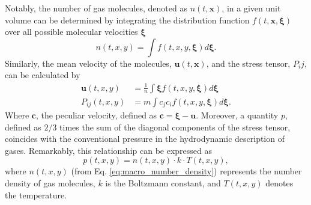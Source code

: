 Notably, the number of gas molecules, denoted as $n(t,\mathbf{x})$, in a given unit volume can be determined by integrating the distribution function $f(t,\mathbf{x},\boldsymbol{\xi})$ over all possible molecular velocities $\boldsymbol{\xi}$\cite{kogan1969rarefied}
\begin{equation} \label{eq:macro_number_density}
    n\left(t,x,y\right)
    =
    \int f\left(t,x,y,\boldsymbol{\xi}\right)d \boldsymbol{\xi}
    .
\end{equation}
Similarly, the mean velocity of the molecules, $\mathbf{u}(t,\mathbf{x})$, and the stress tensor, $P_ij$, can be calculated by
\begin{align}
    \mathbf{u}\left(t,x,y\right) &= \frac{1}{n}\int \boldsymbol{\xi}f\left(t,x,y,\boldsymbol{\xi}\right) d\boldsymbol{\xi} \label{eq:macro_velocity} \\
    P_{ij}\left(t,x,y\right) &= m\int c_jc_i f\left(t,x,y,\boldsymbol{\xi}\right) d\boldsymbol{\xi} \label{eq:macro_stress}
    .
\end{align}
Where $\mathbf{c}$, the peculiar velocity, defined as $\mathbf{c}=\boldsymbol{\xi}-\mathbf{u}$.
Moreover, a quantity $p$, defined as $2/3$ times the sum of the diagonal components of the stress tensor, coincides with the conventional pressure in the hydrodynamic description of gases. Remarkably, this relationship can be expressed as
\begin{equation}
    p(t,x,y)=n(t,x,y)\cdot k\cdot T(t,x,y)
    ,
\end{equation}
where $n(t,x,y)$ (from Eq. \ref{eq:macro_number_density}) represents the number density of gas molecules, $k$ is the Boltzmann constant, and $T(t,x,y)$ denotes the temperature.
